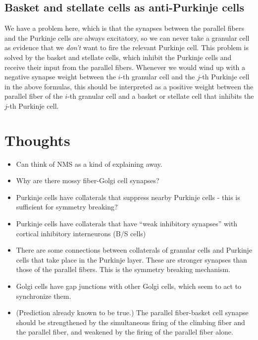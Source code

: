 \documentclass{article}
\theoremstyle{definition}
\begin{document}
\subsection{Basket and stellate cells as anti-Purkinje cells}

We have a problem here, which is that the synapses between the
parallel fibers and the Purkinje cells are always excitatory, so we
can never take a granular cell as evidence that we {\em don't} want to
fire the relevant Purkinje cell. This problem is solved by the basket
and stellate cells, which inhibit the Purkinje cells and receive their
input from the parallel fibers. Whenever we would wind up with a
negative synapse weight between the $i$-th granular cell and the
$j$-th Purkinje cell in the above formulas, this should be interpreted
as a positive weight between the parallel fiber of the $i$-th granular
cell and a basket or stellate cell that inhibits the $j$-th Purkinje cell.



\section{Thoughts}

\begin{itemize}
\item Can think of NMS as a kind of explaining away.
\item Why are there mossy fiber-Golgi cell synapses?
\item Purkinje cells have collaterals that suppress nearby Purkinje
  cells - this is sufficient for symmetry breaking?
\item Purkinje cells have collaterals that have ``weak inhibitory
  synapses'' with cortical inhibitory interneurons (B/S cells)

\item There are some connections between collaterals of granular cells
  and Purkinje cells that take place in the Purkinje layer. These are
  stronger synapses than those of the parallel fibers. This is the
  symmetry breaking mechanism.

\item Golgi cells have gap junctions with other Golgi cells, which
  seem to act to synchronize them.

\item (Prediction already known to be true.)
The parallel fiber-basket cell synapse should be strengthened by the
simultaneous firing of the climbing fiber and the parallel fiber, and
weakened by the firing of the parallel fiber alone.


\end{itemize}
\end{document}

